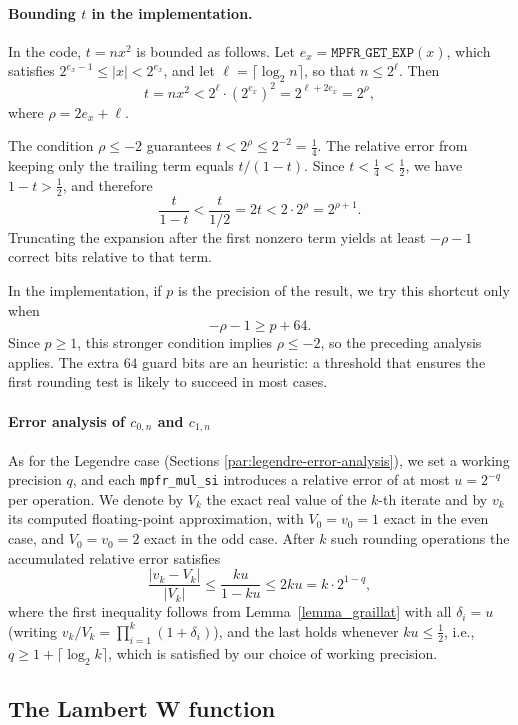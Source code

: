 \documentclass[12pt]{amsart}
\begin{document}
\paragraph{\textbf{Bounding $t$ in the implementation.}}
In the code, $t = nx^2$ is bounded as follows.
Let $e_x = \texttt{MPFR\_GET\_EXP}(x)$, which satisfies
$2^{e_x-1} \le |x| < 2^{e_x}$, and let
$\ell = \lceil \log_2 n \rceil$, so that $n \le 2^\ell$.
Then
\[
  t = nx^2 < 2^\ell \cdot \left(2^{e_x}\right)^2
          = 2^{\ell + 2e_x} = 2^\rho,
\]
where $\rho = 2e_x + \ell$.

The condition $\rho \le -2$ guarantees
$t < 2^\rho \le 2^{-2} = \tfrac{1}{4}$.
The relative error from keeping only the trailing term equals $t/(1-t)$.
Since $t < \tfrac{1}{4} < \tfrac{1}{2}$, we have $1 - t > \tfrac{1}{2}$,
and therefore
\[
  \frac{t}{1-t} < \frac{t}{1/2} = 2t < 2 \cdot 2^\rho = 2^{\rho+1}.
\]
Truncating the expansion after the first nonzero term yields at least
$-\rho - 1$ correct bits relative to that term.

In the implementation, if $p$ is the precision of the result, we try this
shortcut only when
\[
  -\rho - 1 \ge p + 64.
\]
Since $p \ge 1$, this stronger condition implies $\rho \le -2$, so the
preceding analysis applies. The extra $64$ guard bits are an heuristic:
a threshold that ensures the first rounding test is likely to succeed
in most cases.

\paragraph{\textbf{Error analysis of $c_{0,n}$ and $c_{1,n}$}}
As for the Legendre case (Sections \ref{par:legendre-error-analysis}), we set
a working precision $q$, and each \texttt{mpfr\_mul\_si} introduces a relative
error of at most $u = 2^{-q}$ per operation. We denote by $V_k$ the exact real
value of the $k$-th iterate and by $v_k$ its computed floating-point approximation,
with $V_0 = v_0 = 1$ exact in the even case, and $V_0 = v_0 = 2$ exact in the odd
case. After $k$ such rounding
operations the accumulated relative error satisfies
\[
  \frac{|v_k - V_k|}{|V_k|}
  \le \frac{ku}{1-ku}
  \le 2ku = k \cdot 2^{1-q},
\]
where the first inequality follows from Lemma~\ref{lemma_graillat} with all
$\delta_i = u$ (writing $v_k/V_k = \prod_{i=1}^k(1+\delta_i)$), and the last
holds whenever $ku \le \tfrac{1}{2}$, i.e., $q \ge 1 + \lceil\log_2 k\rceil$,
which is satisfied by our choice of working precision.

\subsection{The Lambert W function}
\end{document}
